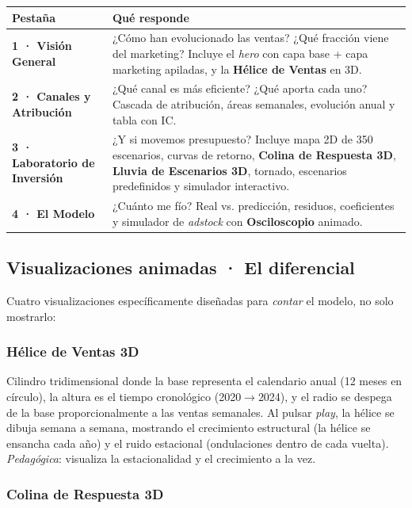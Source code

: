 \begin{center}
\begin{tabular}{@{}p{3.8cm} p{10.5cm}@{}}
\toprule
\textbf{Pestaña} & \textbf{Qué responde} \\
\midrule
\textcolor{kmgolddark}{\textbf{1 · Visión General}} & ¿Cómo han evolucionado las ventas? ¿Qué fracción viene del marketing? Incluye el \textit{hero} con capa base + capa marketing apiladas, y la \textbf{Hélice de Ventas} en 3D. \\
\textcolor{kmgolddark}{\textbf{2 · Canales y Atribución}} & ¿Qué canal es más eficiente? ¿Qué aporta cada uno? Cascada de atribución, áreas semanales, evolución anual y tabla con IC. \\
\textcolor{kmgolddark}{\textbf{3 · Laboratorio de Inversión}} & ¿Y si movemos presupuesto? Incluye mapa 2D de 350 escenarios, curvas de retorno, \textbf{Colina de Respuesta 3D}, \textbf{Lluvia de Escenarios 3D}, tornado, escenarios predefinidos y simulador interactivo. \\
\textcolor{kmgolddark}{\textbf{4 · El Modelo}} & ¿Cuánto me fío? Real vs. predicción, residuos, coeficientes y simulador de \textit{adstock} con \textbf{Osciloscopio} animado. \\
\bottomrule
\end{tabular}
\end{center}

\subsection{Visualizaciones animadas · El diferencial}

Cuatro visualizaciones específicamente diseñadas para \textit{contar} el modelo, no solo mostrarlo:

\subsubsection{Hélice de Ventas 3D}

Cilindro tridimensional donde la base representa el calendario anual (12 meses en círculo), la altura es el tiempo cronológico (2020$\rightarrow$2024), y el radio se despega de la base proporcionalmente a las ventas semanales. Al pulsar \textit{play}, la hélice se dibuja semana a semana, mostrando el crecimiento estructural (la hélice se ensancha cada año) y el ruido estacional (ondulaciones dentro de cada vuelta). \textit{Pedagógica}: visualiza la estacionalidad y el crecimiento a la vez.

\subsubsection{Colina de Respuesta 3D}

